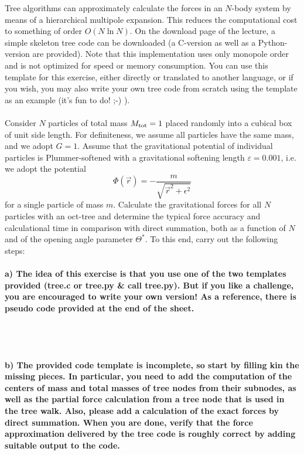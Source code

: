 Tree algorithms can approximately calculate the forces in an 
$N$-body system by means of a hierarchical multipole expansion. 
This reduces the computational cost to something of order 
$O(N \ln N)$. On the download page of the lecture, a simple 
skeleton tree code can be downloaded (a C-version as well as a 
Python-version are provided). Note that this implementation uses 
only monopole order and is not optimized for speed or memory 
consumption. You can use this template for this exercise, 
either directly or translated to another language, or if you 
wish, you may also write your own tree code from scratch using 
the template as an example (it’s fun to do! ;-) ). \\
\\
Consider $N$ particles of total mass $M_{\textnormal{tot}}=1$ 
placed randomly into a cubical box of unit side length. For 
definiteness, we assume all particles have the same mass, and 
we adopt $G=1$. Assume that the gravitational potential of 
individual particles is Plummer-softened with a gravitational 
softening length $\varepsilon=0.001$, 
i.e. we adopt the potential
\begin{equation}
    \Phi(\vec r)=-\frac{m}{\sqrt{\vec r^2+\epsilon^2}}
\end{equation}
for a single particle of mass $m$.
Calculate the gravitational forces for all $N$ particles with an 
oct-tree and determine the typical force accuracy and 
calculational time in comparison with direct summation, both as 
a function of $N$ and of the opening angle parameter $\Theta^*$. 
To this end, carry out the following steps:


\paragraph{a) The idea of this exercise is that you use one of 
    the two templates provided (tree.c or tree.py \& call 
    tree.py). But if you like a challenge, you are encouraged 
    to write your own version! As a reference, there is pseudo 
    code provided at the end of the sheet.
} \ \\
    \\


\paragraph{b)
    The provided code template is incomplete, so start by filling 
    kin the missing pieces. In particular, you need to add the 
    computation of the centers of mass and total masses of tree 
    nodes from their subnodes, as well as the partial force 
    calculation from a tree node that is used in the tree walk. 
    Also, please add a calculation of the exact forces by 
    direct summation. When you are done, verify that the force 
    approximation delivered by the tree code is roughly correct 
    by adding suitable output to the code.
} \ \\
    \\

